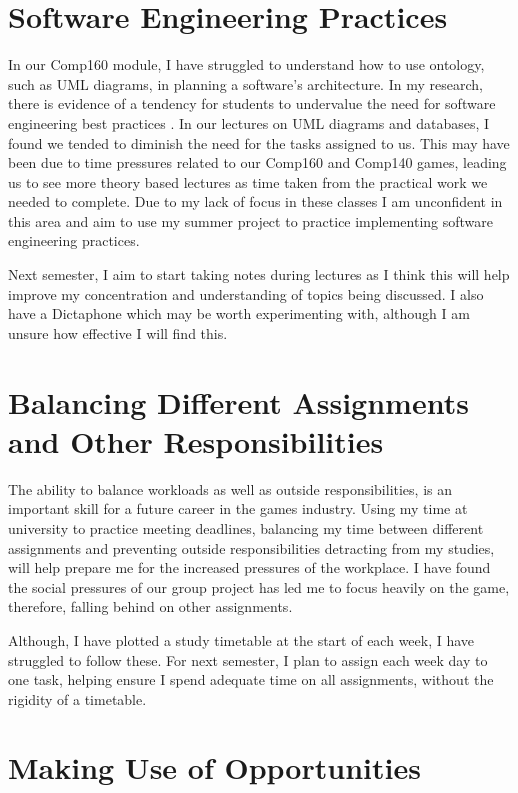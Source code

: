 \documentclass{scrartcl}
\begin{document}
\section{Software Engineering Practices}

In our Comp160 module, I have struggled to understand how to use ontology, such as UML diagrams, in planning a software's architecture. In my research, there is evidence of a tendency for students to undervalue the need for software engineering best practices \cite{1}. In our lectures on UML diagrams and databases, I found we tended to diminish the need for the tasks assigned to us. This may have been due to time pressures related to our Comp160 and Comp140 games, leading us to see more theory based lectures as time taken from the practical work we needed to complete. Due to my lack of focus in these classes I am unconfident in this area and aim to use my summer project to practice implementing software engineering practices. 

Next semester, I aim to start taking notes during lectures as I think this will help improve my concentration and understanding of topics being discussed. I also have a Dictaphone which may be worth experimenting with, although I am unsure how effective I will find this.

\section{Balancing Different Assignments and Other Responsibilities}

The ability to balance workloads as well as outside responsibilities, is an important skill for a future career in the games industry. Using my time at university to practice meeting deadlines, balancing my time between different assignments and preventing outside responsibilities detracting from my studies, will help prepare me for the increased pressures of the workplace. I have found the social pressures of our group project has led me to focus heavily on the game, therefore, falling behind on other assignments. 

Although, I have plotted a study timetable at the start of each week, I have struggled to follow these. For next semester, I plan to assign each week day to one task, helping ensure I spend adequate time on all assignments, without the rigidity of a timetable.

\section{Making Use of Opportunities}
\end{document}
